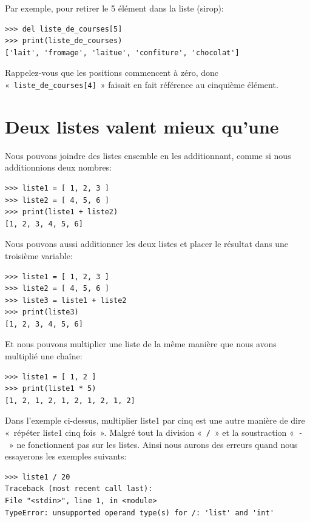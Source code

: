 Par exemple, pour retirer le 5 élément dans la liste (sirop):

\begin{Verbatim}[frame=single,rulecolor=\color{mbleu}, label=à taper]
>>> del liste_de_courses[5]
>>> print(liste_de_courses)
['lait', 'fromage', 'laitue', 'confiture', 'chocolat']
\end{Verbatim}


Rappelez-vous que les positions commencent à zéro, donc «~\texttt{liste\_de\_courses[4]}~» faisait en fait référence au cinquième élément.

\section*{Deux listes valent mieux qu'une}

Nous pouvons joindre des listes ensemble en les additionnant, comme si nous additionnions deux nombres:

\begin{Verbatim}[frame=single,rulecolor=\color{mbleu}, label=à taper]
>>> liste1 = [ 1, 2, 3 ]
>>> liste2 = [ 4, 5, 6 ]
>>> print(liste1 + liste2)
[1, 2, 3, 4, 5, 6]
\end{Verbatim}


Nous pouvons aussi additionner les deux listes et placer le résultat dans une troisième variable:

\begin{Verbatim}[frame=single,rulecolor=\color{mbleu}, label=à taper]
>>> liste1 = [ 1, 2, 3 ]
>>> liste2 = [ 4, 5, 6 ]
>>> liste3 = liste1 + liste2
>>> print(liste3)
[1, 2, 3, 4, 5, 6]
\end{Verbatim}

Et nous pouvons multiplier une liste de la même manière que nous avons multiplié une chaîne:

\begin{Verbatim}[frame=single,rulecolor=\color{mbleu}, label=à taper]
>>> liste1 = [ 1, 2 ]
>>> print(liste1 * 5)
[1, 2, 1, 2, 1, 2, 1, 2, 1, 2]
\end{Verbatim}

Dans l'exemple ci-dessus, multiplier liste1 par cinq est une autre manière de dire «~répéter liste1 cinq fois~». Malgré tout la division «~\texttt{/}~»  et la soustraction «~\texttt{-}~» ne fonctionnent pas sur les listes.
Ainsi nous aurons des erreurs quand nous essayerons les exemples suivants:

\begin{Verbatim}[frame=single,rulecolor=\color{red}, label=erreur]
>>> liste1 / 20
Traceback (most recent call last):
File "<stdin>", line 1, in <module>
TypeError: unsupported operand type(s) for /: 'list' and 'int'
\end{Verbatim}

